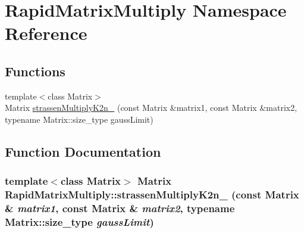 \hypertarget{namespaceRapidMatrixMultiply}{
\section{RapidMatrixMultiply Namespace Reference}
\label{namespaceRapidMatrixMultiply}
}


\subsection*{Functions}
\begin{CompactItemize}
\item 
{\footnotesize template$<$class Matrix$>$ }\\Matrix \hyperlink{namespaceRapidMatrixMultiply_b79be5fd9d32a42401aa8c1a7fcbda32}{strassenMultiplyK2n\_\-} (const Matrix \&matrix1, const Matrix \&matrix2, typename Matrix::size\_\-type gaussLimit)
\end{CompactItemize}


\subsection{Function Documentation}
\hypertarget{namespaceRapidMatrixMultiply_b79be5fd9d32a42401aa8c1a7fcbda32}{
\subsubsection[strassenMultiplyK2n\_\-]{\setlength{\rightskip}{0pt plus 5cm}template$<$class Matrix$>$ Matrix RapidMatrixMultiply::strassenMultiplyK2n\_\- (const Matrix \& {\em matrix1}, \/  const Matrix \& {\em matrix2}, \/  typename Matrix::size\_\-type {\em gaussLimit})}}
\label{namespaceRapidMatrixMultiply_b79be5fd9d32a42401aa8c1a7fcbda32}


